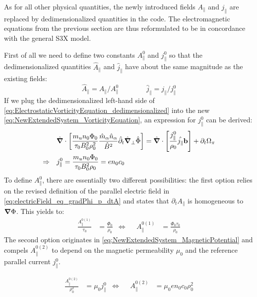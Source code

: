 

As for all other physical quantities, the newly introduced fields $A_\parallel$ and $j_\parallel$ are replaced by dedimensionalized quantities in the code. The electromagnetic equations from the previous section are thus reformulated to be in concordance with the general S3X model.

First of all we need to define two constants $A_\parallel^0$ and $j_\parallel^0$ so that the dedimensionalized quantities $\hat{A}_\parallel$ and $\hat{j}_\parallel$ have about the same magnitude as the existing fields:
$$\hat{A}_\parallel = A_\parallel / A_\parallel^0 \qquad\qquad \hat{j}_\parallel = j_\parallel / j_\parallel^0$$
If we plug the dedimensionalized left-hand side of \autoref{eq:ElectrostaticVorticityEquation_dedimensionalized} into the new \autoref{eq:NewExtendedSystem_VorticityEquation}, an expression for $j_\parallel^0$ can be derived:
\begin{align}
	&&&\hat{\grad}\cdot\left[\frac{m_un_0\Phi_0}{\tau_0B_0^2\rho_0^2}\frac{\hat{m}_\alpha \hat{n}_\alpha}{ \hat{B}^2}\hat{\partial}_t\hat{\grad}_\perp\hat{\Phi}\right] = \hat{\grad}\cdot\left[\frac{j_\parallel^0}{\rho_0}\hat{j_\parallel}\mathbf{b}\right]  + \partial_t \Omega_\pi \nonumber \\
	\Rightarrow&&& j_\parallel^0 = \frac{m_un_0\Phi_0}{\tau_0B_0^2\rho_0} = en_0c_0 \nonumber
\end{align}
To define $A_\parallel^0$, there are essentially two different possibilities: the first option relies on the revised definition of the parallel electric field in \autoref{eq:electricField_eq_gradPhi_p_dtA} and states that $\partial_tA_\parallel$ is homogeneous to $\grad\Phi$. This yields to:
\begin{align}
	\label{eq:FirstOptionApara0}
	\frac{A_\parallel^{0(1)}}{\tau_0} &= \frac{\Phi_0}{\rho_0} &\Leftrightarrow&& A_\parallel^{0(1)} &= \frac{\Phi_0\tau_0}{\rho_0}
\end{align}
The second option originates in \autoref{eq:NewExtendedSystem_MagneticPotential} and compels $A_\parallel^{0(2)}$ to depend on the magnetic permeability $\mu_0$ and the reference parallel current $j_\parallel^0$.

\begin{align}
	\label{eq:SecondOptionApara0}
	\frac{A_\parallel^{0(2)}}{\rho_0^2} &= \mu_0j_\parallel^0 &\Leftrightarrow&& A_\parallel^{0(2)} &= \mu_0en_0c_0\rho_0^2
\end{align}

